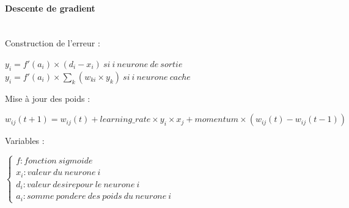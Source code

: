     \paragraph{Descente de gradient} \cite{Touzet_1992} \\
      Construction de l'erreur : 
	\begin{center}
	  $y_{i} = f'(a_i) \times ( d_i - x_i ) \ si\ i\ neurone\ de\ sortie $ \\
	  $y_{i} = f'(a_i) \times \sum \limits_{k} ( w_{ki} \times y_k )\ si\ i\ neurone\ cache $
	\end{center}
      Mise à jour des poids :
	\begin{center}
	  $w_{ij}(t+1) = w_{ij}(t) + learning\_rate \times y_{i} \times x_j + momentum \times 
	  (w_{ij}(t) - w_{ij}(t-1) )$
	\end{center}
      Variables : 
	\begin{center}
	  $\left\lbrace \begin{array}{lll} 
	    f : fonction\ sigmoide \\
	    x_i : valeur\ du\ neurone\ i\\
	    d_i : valeur\ desire pour\ le\ neurone\ i\\
	    a_i : somme\ pondere\ des\ poids\ du\ neurone\ i
	  \end{array} \right.$
	\end{center}
      


